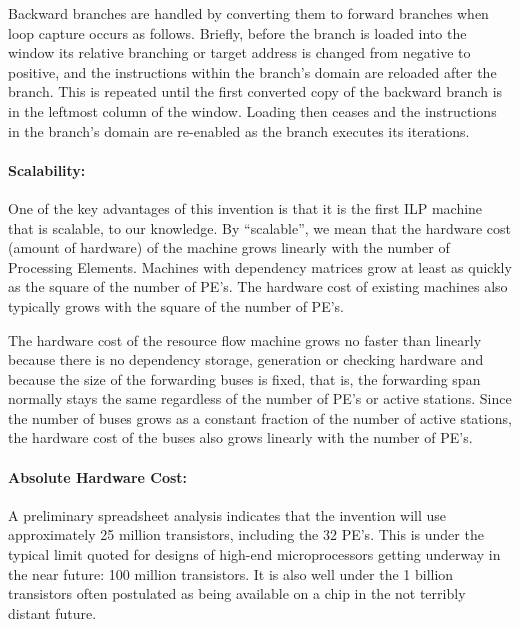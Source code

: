 \documentclass[10pt,dvips]{article}
\begin{document}
Backward branches are handled by converting them to forward branches
when loop capture occurs as follows.
Briefly, before the branch is loaded into the window its relative
branching or target address is changed from negative to positive, and the
instructions within the branch's domain are reloaded after the branch.
This is repeated until the first converted copy of the backward branch
is in the leftmost column of the window. Loading then ceases and
the instructions in the branch's domain are re-enabled as the branch
executes its iterations.

\paragraph{Scalability: }
One of the key advantages of this invention is that it is the first
ILP machine
that is scalable, to our knowledge. By ``scalable'', we mean that the
hardware cost (amount of hardware) of the machine grows linearly with
the number of Processing
Elements. Machines with dependency matrices grow at least as quickly as
the square of the number of PE's. The hardware cost of existing machines
also typically grows with the square of the number of PE's.

The hardware cost of the resource flow machine grows no faster than
linearly because there is no dependency storage, generation or checking
hardware and because the size of the forwarding buses is fixed, that is,
the forwarding span normally stays the same regardless of the number
of PE's or active stations. Since the number of buses grows as a constant
fraction of the number of active stations, the hardware cost of the
buses also grows linearly with the number of PE's.

\paragraph{Absolute Hardware Cost: }
A preliminary spreadsheet analysis indicates that the invention will use
approximately 25 million transistors, including the 32 PE's. This is
under the typical limit quoted for designs of high-end microprocessors
getting underway in the near future: 100 million transistors. It is
also well under the 1 billion transistors often postulated as being
available on a chip in the not terribly distant future.
\end{document}
